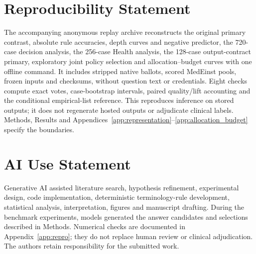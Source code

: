 \documentclass{article}
\begin{document}
\section*{Reproducibility Statement}
The accompanying anonymous replay archive reconstructs the original primary contrast, absolute rule accuracies, depth curves and negative predictor, the 720-case decision analysis, the 256-case Health analysis, the 128-case output-contract primary, exploratory joint policy selection and allocation--budget curves with one offline command. It includes stripped native ballots, scored MedEinst pools, frozen inputs and checksums, without question text or credentials. Eight checks compute exact votes, case-bootstrap intervals, paired quality/lift accounting and the conditional empirical-list reference. This reproduces inference on stored outputs; it does not regenerate hosted outputs or adjudicate clinical labels. Methods, Results and Appendices~\ref{app:representation}--\ref{app:allocation_budget} specify the boundaries.

\section*{AI Use Statement}
Generative AI assisted literature search, hypothesis refinement, experimental design, code implementation, deterministic terminology-rule development, statistical analysis, interpretation, figures and manuscript drafting. During the benchmark experiments, models generated the answer candidates and selections described in Methods. Numerical checks are documented in Appendix~\ref{app:repro}; they do not replace human review or clinical adjudication. The authors retain responsibility for the submitted work.


\end{document}
